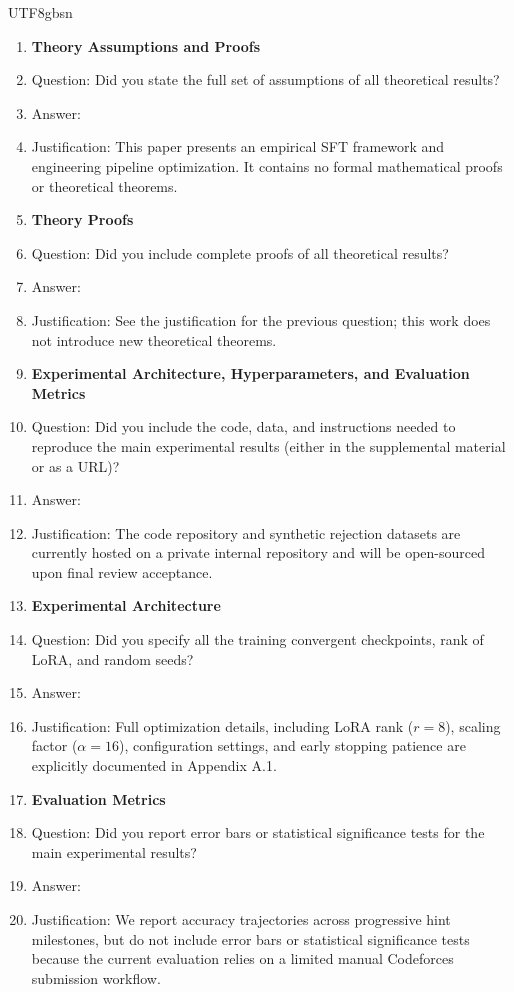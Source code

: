 \documentclass{article}
\begin{document}
\begin{CJK*}{UTF8}{gbsn}
\begin{enumerate}
\item {\bf Theory Assumptions and Proofs}
    \item[] Question: Did you state the full set of assumptions of all theoretical results?
    \item[] Answer: \answerNA{}
    \item[] Justification: This paper presents an empirical SFT framework and engineering pipeline optimization. It contains no formal mathematical proofs or theoretical theorems.

\item {\bf Theory Proofs}
    \item[] Question: Did you include complete proofs of all theoretical results?
    \item[] Answer: \answerNA{}
    \item[] Justification: See the justification for the previous question; this work does not introduce new theoretical theorems.

\item {\bf Experimental Architecture, Hyperparameters, and Evaluation Metrics}
    \item[] Question: Did you include the code, data, and instructions needed to reproduce the main experimental results (either in the supplemental material or as a URL)?
    \item[] Answer: \answerNo{}
    \item[] Justification: The code repository and synthetic rejection datasets are currently hosted on a private internal repository and will be open-sourced upon final review acceptance.

\item {\bf Experimental Architecture}
    \item[] Question: Did you specify all the training convergent checkpoints, rank of LoRA, and random seeds?
    \item[] Answer: \answerYes{}
    \item[] Justification: Full optimization details, including LoRA rank ($r=8$), scaling factor ($\alpha=16$), configuration settings, and early stopping patience are explicitly documented in Appendix A.1.

\item {\bf Evaluation Metrics}
    \item[] Question: Did you report error bars or statistical significance tests for the main experimental results?
    \item[] Answer: \answerNo{}
    \item[] Justification: We report accuracy trajectories across progressive hint milestones, but do not include error bars or statistical significance tests because the current evaluation relies on a limited manual Codeforces submission workflow.


\end{enumerate}
\end{CJK*}
\end{document}
